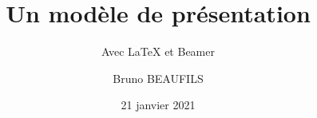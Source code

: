 \title{Un modèle de présentation}
\subtitle{Avec \LaTeX{} et Beamer}
\author{Bruno BEAUFILS}
\date{21 janvier 2021}
